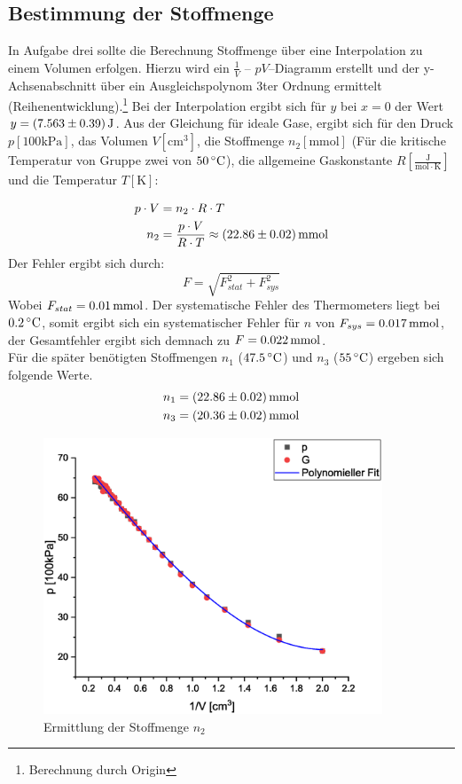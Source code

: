 \subsection{Bestimmung der Stoffmenge}
In Aufgabe drei sollte die Berechnung Stoffmenge über eine Interpolation zu einem Volumen erfolgen. Hierzu wird ein $\frac{1}{V}$ -- $pV$--Diagramm erstellt und der y-Achsenabschnitt über ein Ausgleichspolynom 3ter Ordnung ermittelt (Reihenentwicklung).\footnote{Berechnung durch Origin} Bei der Interpolation ergibt sich für $y$ bei $x=0$ der Wert $y=\unit[(7.563 \pm 0.39)]{J}  $. Aus der Gleichung für ideale Gase, ergibt sich für den Druck $p [\mathrm{100kPa}]$, das Volumen $V [\mathrm{cm^3}]$, die Stoffmenge $n_2 [\mathrm{mmol}]$ (Für die kritische Temperatur von Gruppe zwei von $\unit[50]{^\circ C}$), die allgemeine Gaskonstante $R [\mathrm{\frac{J}{mol \cdot K}}]$ und die Temperatur $T [\mathrm{K}]$:

\begin{align}
p \cdot V &= n_2 \cdot R \cdot T\\
n_2 &= \frac{p \cdot V}{R \cdot T} \approx \unit[(22.86 \pm 0.02)]{mmol} \notag
\end{align}
Der Fehler ergibt sich durch:
\[
F = \sqrt{F_{stat}^2 + F_{sys}^2}
\]
Wobei $F_{stat} = \unit[0.01]{mmol}$. Der systematische Fehler des Thermometers liegt bei $\unit[0.2]{^\circ C}$, somit ergibt sich ein systematischer Fehler für $n$ von $F_{sys} = \unit[0.017]{mmol}$, der Gesamtfehler ergibt sich demnach zu $F = \unit[0.022]{mmol}$. \\
Für die später benötigten Stoffmengen $n_1$ ($\unit[47.5]{^\circ C}$) und $n_3$ ($\unit[55]{^\circ C}$) ergeben sich folgende Werte.
\begin{align*}
n_1 &= \unit[(22.86 \pm 0.02)]{mmol}\\
n_3 &= \unit[(20.36 \pm 0.02)]{mmol}
\end{align*}

\begin{figure}
\includegraphics[width=0.9\textwidth]{Bilder/aufgabe_3.eps}
\caption{Ermittlung der Stoffmenge $n_2$}
\label{fig:aufgabe3}
\end{figure}